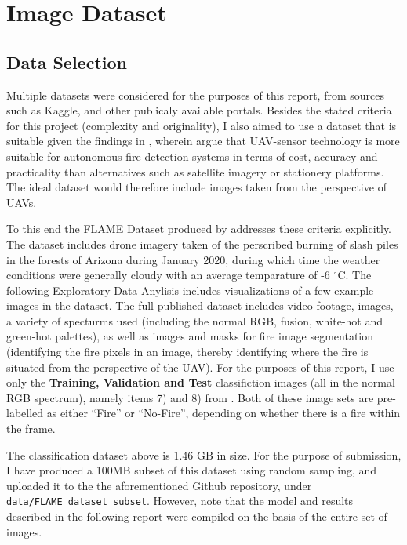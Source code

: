 \documentclass[a4paper,11pt]{article} %
\begin{document}
\section{Image Dataset}

\subsection{Data Selection}
Multiple datasets were considered for the purposes of this report, from sources such as Kaggle, and other publicaly available portals. Besides the stated
criteria for this project (complexity and originality), I also aimed to use a dataset that is suitable given the findings in , wherein  argue that UAV-sensor
technology is more suitable for autonomous fire detection systems in terms of cost, accuracy and practicality than alternatives such as satellite imagery or stationery platforms.
The ideal dataset would therefore include images taken from the perspective of UAVs.

\medskip

To this end the FLAME Dataset produced by  addresses these criteria explicitly. The dataset includes drone imagery taken of the perscribed burning
of slash piles in the forests of Arizona during January 2020, during which time the weather conditions were generally cloudy with an average temparature of -6 $^{\circ}$C. The following Exploratory Data Anylisis includes visualizations of a few example images in the dataset.
The full published dataset includes video footage, images, a variety of specturms used (including the normal RGB, fusion, white-hot and green-hot palettes), as well as images and masks for fire image segmentation (identifying the fire pixels in an image, thereby identifying where
the fire is situated from the perspective of the UAV). For the purposes of this report, I use only the \textbf{Training, Validation and Test} classifiction images (all in the normal RGB spectrum), namely items 7) and 8) from \cite{FLAME_IEEE}. Both of these image sets are pre-labelled as either ``Fire'' or ``No-Fire'',
depending on whether there is a fire within the frame.

\medskip

The classification dataset above is 1.46 GB in size. For the purpose of submission, I have produced a 100MB subset of this dataset using random sampling, and uploaded it to the the aforementioned Github repository, under \verb!data/FLAME_dataset_subset!. However,
note that the model and results described in the following report were compiled on the basis of the entire set of images.
\end{document}
